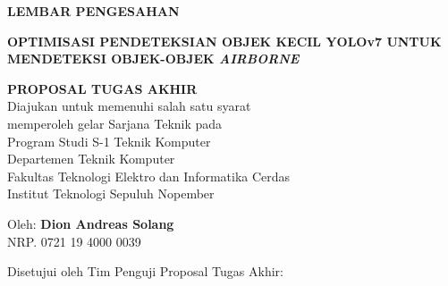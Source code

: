 \begin{center}
	\large
  \textbf{LEMBAR PENGESAHAN}
\end{center}

\thispagestyle{empty}

\begin{center}
  \textbf{OPTIMISASI PENDETEKSIAN OBJEK KECIL YOLOv7 UNTUK MENDETEKSI OBJEK-OBJEK \emph{AIRBORNE}}
\end{center}

\begingroup
  \small

  \begin{center}
    \textbf{PROPOSAL TUGAS AKHIR} \\
    Diajukan untuk memenuhi salah satu syarat \\
    memperoleh gelar Sarjana Teknik pada \\
    Program Studi S-1 Teknik Komputer \\
    Departemen Teknik Komputer \\
    Fakultas Teknologi Elektro dan Informatika Cerdas \\
    Institut Teknologi Sepuluh Nopember
  \end{center}

  \vspace{4ex}

  \begin{center}
    Oleh: \textbf{Dion Andreas Solang} \\
    NRP. 0721 19 4000 0039
  \end{center}

  \vspace{4ex}

  \begin{center}
    Disetujui oleh Tim Penguji Proposal Tugas Akhir:
  \end{center}

  \begingroup
    \setlength{\tabcolsep}{0pt}

